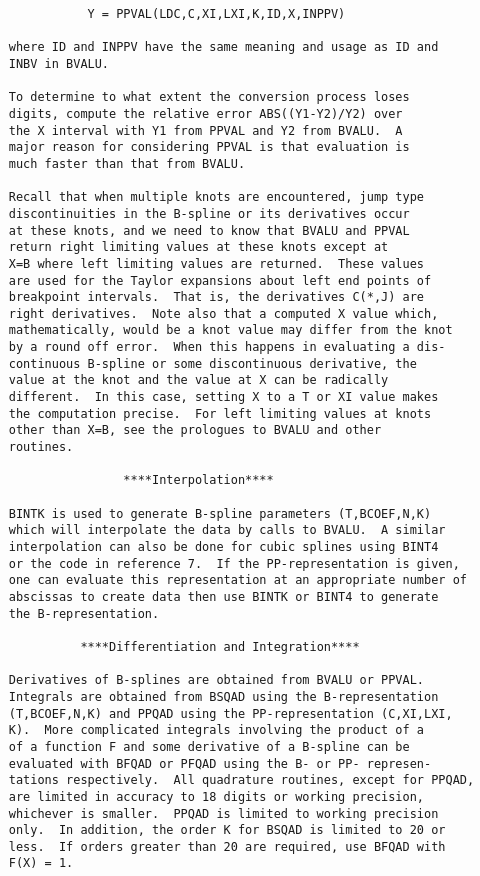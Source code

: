 \begin{verbatim}
                Y = PPVAL(LDC,C,XI,LXI,K,ID,X,INPPV)

     where ID and INPPV have the same meaning and usage as ID and
     INBV in BVALU.

     To determine to what extent the conversion process loses
     digits, compute the relative error ABS((Y1-Y2)/Y2) over
     the X interval with Y1 from PPVAL and Y2 from BVALU.  A
     major reason for considering PPVAL is that evaluation is
     much faster than that from BVALU.

     Recall that when multiple knots are encountered, jump type
     discontinuities in the B-spline or its derivatives occur
     at these knots, and we need to know that BVALU and PPVAL
     return right limiting values at these knots except at
     X=B where left limiting values are returned.  These values
     are used for the Taylor expansions about left end points of
     breakpoint intervals.  That is, the derivatives C(*,J) are
     right derivatives.  Note also that a computed X value which,
     mathematically, would be a knot value may differ from the knot
     by a round off error.  When this happens in evaluating a dis-
     continuous B-spline or some discontinuous derivative, the
     value at the knot and the value at X can be radically
     different.  In this case, setting X to a T or XI value makes
     the computation precise.  For left limiting values at knots
     other than X=B, see the prologues to BVALU and other
     routines.

                     ****Interpolation****

     BINTK is used to generate B-spline parameters (T,BCOEF,N,K)
     which will interpolate the data by calls to BVALU.  A similar
     interpolation can also be done for cubic splines using BINT4
     or the code in reference 7.  If the PP-representation is given,
     one can evaluate this representation at an appropriate number of
     abscissas to create data then use BINTK or BINT4 to generate
     the B-representation.

               ****Differentiation and Integration****

     Derivatives of B-splines are obtained from BVALU or PPVAL.
     Integrals are obtained from BSQAD using the B-representation
     (T,BCOEF,N,K) and PPQAD using the PP-representation (C,XI,LXI,
     K).  More complicated integrals involving the product of a
     of a function F and some derivative of a B-spline can be
     evaluated with BFQAD or PFQAD using the B- or PP- represen-
     tations respectively.  All quadrature routines, except for PPQAD,
     are limited in accuracy to 18 digits or working precision,
     whichever is smaller.  PPQAD is limited to working precision
     only.  In addition, the order K for BSQAD is limited to 20 or
     less.  If orders greater than 20 are required, use BFQAD with
     F(X) = 1.


\end{verbatim}
